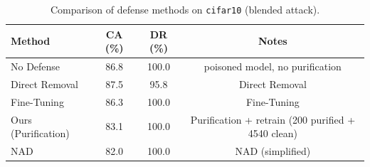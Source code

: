 \begin{table}[htbp]
\centering
\caption{Comparison of defense methods on \texttt{cifar10} (blended attack).}
\label{tab:results}
\begin{tabular}{lccc}
\toprule
Method & CA (\%) & DR (\%) & Notes \\
\midrule
  No Defense & 86.8 & 100.0 & poisoned model, no purification \\
  Direct Removal & 87.5 & 95.8 & Direct Removal \\
  Fine-Tuning & 86.3 & 100.0 & Fine-Tuning \\
  Ours (Purification) & 83.1 & 100.0 & Purification + retrain (200 purified + 4540 clean) \\
  NAD & 82.0 & 100.0 & NAD (simplified) \\
\bottomrule
\end{tabular}
\end{table}